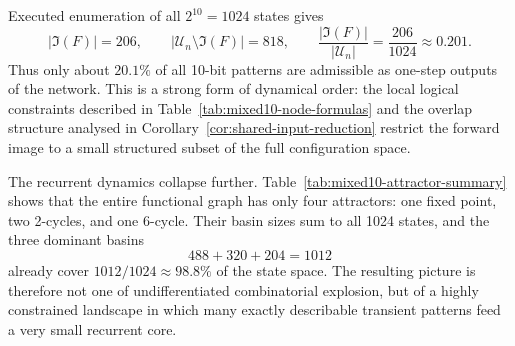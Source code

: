 \documentclass[11pt]{article}
\theoremstyle{definition}
\newcommand{\U}{\mathcal{U}_n}
\begin{document}
Executed enumeration of all \(2^{10}=1024\) states gives
\[
|\Im(F)|=206,
\qquad
|\U\setminus\Im(F)|=818,
\qquad
\frac{|\Im(F)|}{|\U|}=\frac{206}{1024}\approx 0.201.
\]
Thus only about \(20.1\%\) of all 10-bit patterns are admissible as one-step outputs of the network.
This is a strong form of dynamical order: the local logical constraints described in
Table~\ref{tab:mixed10-node-formulas} and the overlap structure analysed in
Corollary~\ref{cor:shared-input-reduction} restrict the forward image to a small structured subset
of the full configuration space.

The recurrent dynamics collapse further. Table~\ref{tab:mixed10-attractor-summary} shows that the
entire functional graph has only four attractors: one fixed point, two 2-cycles, and one 6-cycle.
Their basin sizes sum to all 1024 states, and the three dominant basins
\[
488+320+204=1012
\]
already cover \(1012/1024\approx 98.8\%\) of the state space. The resulting picture is therefore not
one of undifferentiated combinatorial explosion, but of a highly constrained landscape in which many
exactly describable transient patterns feed a very small recurrent core.
\end{document}
